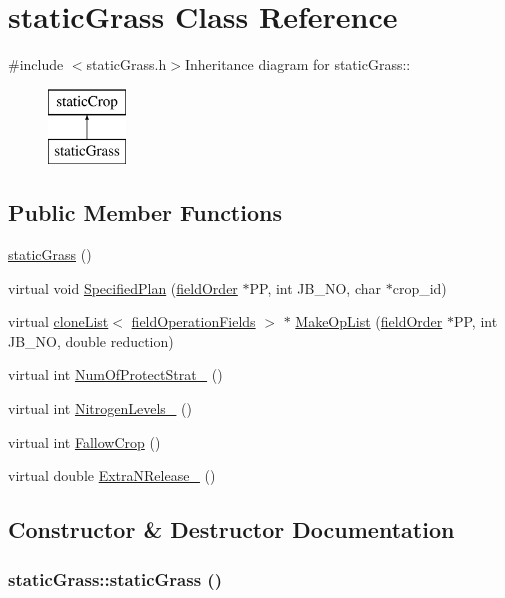 \hypertarget{classstatic_grass}{
\section{staticGrass Class Reference}
\label{classstatic_grass}
}


{\ttfamily \#include $<$staticGrass.h$>$}Inheritance diagram for staticGrass::\begin{figure}[H]
\begin{center}
\leavevmode
\includegraphics[height=2cm]{classstatic_grass}
\end{center}
\end{figure}
\subsection*{Public Member Functions}
\begin{DoxyCompactItemize}
\item 
\hyperlink{classstatic_grass_afaede85fde9514b48037608c7000e04b}{staticGrass} ()
\item 
virtual void \hyperlink{classstatic_grass_a5a251ce2e9a3de9af455b09b3eb9efee}{SpecifiedPlan} (\hyperlink{classfield_order}{fieldOrder} $\ast$PP, int JB\_\-NO, char $\ast$crop\_\-id)
\item 
virtual \hyperlink{classclone_list}{cloneList}$<$ \hyperlink{classfield_operation_fields}{fieldOperationFields} $>$ $\ast$ \hyperlink{classstatic_grass_af46c3861ac733cc63192ab16d2f83696}{MakeOpList} (\hyperlink{classfield_order}{fieldOrder} $\ast$PP, int JB\_\-NO, double reduction)
\item 
virtual int \hyperlink{classstatic_grass_a83a8c218eab33bd04ab8599486beb5ae}{NumOfProtectStrat\_\-} ()
\item 
virtual int \hyperlink{classstatic_grass_ab09bdebca7ebadbbe87286e7bfff149d}{NitrogenLevels\_\-} ()
\item 
virtual int \hyperlink{classstatic_grass_a493499c1294dcfcd85a9b019978e085f}{FallowCrop} ()
\item 
virtual double \hyperlink{classstatic_grass_aba65c94317d6a5a3c2414edf4e242453}{ExtraNRelease\_\-} ()
\end{DoxyCompactItemize}


\subsection{Constructor \& Destructor Documentation}
\hypertarget{classstatic_grass_afaede85fde9514b48037608c7000e04b}{
\subsubsection[{staticGrass}]{\setlength{\rightskip}{0pt plus 5cm}staticGrass::staticGrass ()}}
\label{classstatic_grass_afaede85fde9514b48037608c7000e04b}


